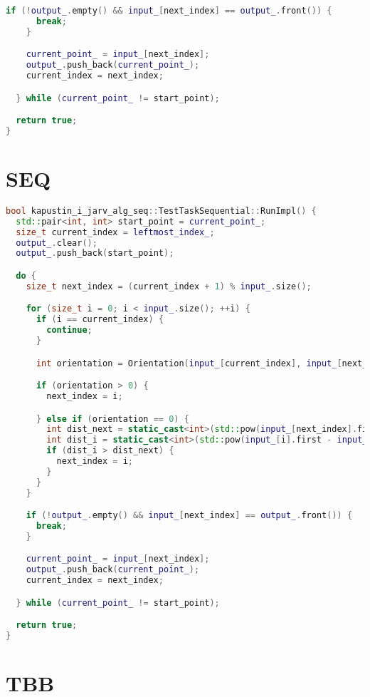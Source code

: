 \documentclass[a4paper,12pt]{article}
\begin{document}
\begin{itemize}
\begin{lstlisting}[language=C++]
    if (!output_.empty() && input_[next_index] == output_.front()) {
      break;
    }

    current_point_ = input_[next_index];
    output_.push_back(current_point_);
    current_index = next_index;

  } while (current_point_ != start_point);

  return true;
}
\end{lstlisting}
\section*{SEQ}

\begin{lstlisting}[language=C++]
bool kapustin_i_jarv_alg_seq::TestTaskSequential::RunImpl() {
  std::pair<int, int> start_point = current_point_;
  size_t current_index = leftmost_index_;
  output_.clear();
  output_.push_back(start_point);

  do {
    size_t next_index = (current_index + 1) % input_.size();

    for (size_t i = 0; i < input_.size(); ++i) {
      if (i == current_index) {
        continue;
      }

      int orientation = Orientation(input_[current_index], input_[next_index], input_[i]);

      if (orientation > 0) {
        next_index = i;

      } else if (orientation == 0) {
        int dist_next = static_cast<int>(std::pow(input_[next_index].first - input_[current_index].first, 2) + std::pow(input_[next_index].second - input_[current_index].second, 2));
        int dist_i = static_cast<int>(std::pow(input_[i].first - input_[current_index].first, 2) + std::pow(input_[i].second - input_[current_index].second, 2));
        if (dist_i > dist_next) {
          next_index = i;
        }
      }
    }

    if (!output_.empty() && input_[next_index] == output_.front()) {
      break;
    }

    current_point_ = input_[next_index];
    output_.push_back(current_point_);
    current_index = next_index;

  } while (current_point_ != start_point);

  return true;
}
\end{lstlisting}

\section*{TBB}


\end{itemize}
\end{document}
